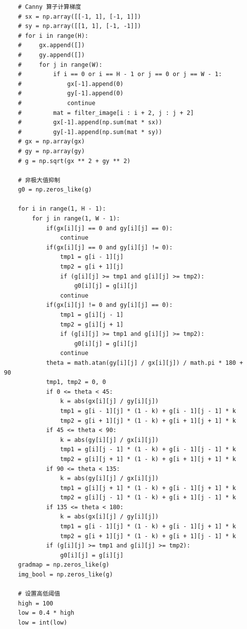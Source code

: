 \documentclass{article}
\begin{document}
\begin{lstlisting}
    # Canny 算子计算梯度
    # sx = np.array([[-1, 1], [-1, 1]])
    # sy = np.array([[1, 1], [-1, -1]])
    # for i in range(H):
    #     gx.append([])
    #     gy.append([])
    #     for j in range(W):
    #         if i == 0 or i == H - 1 or j == 0 or j == W - 1:
    #             gx[-1].append(0)
    #             gy[-1].append(0)
    #             continue
    #         mat = filter_image[i : i + 2, j : j + 2]
    #         gx[-1].append(np.sum(mat * sx))
    #         gy[-1].append(np.sum(mat * sy))
    # gx = np.array(gx)
    # gy = np.array(gy)
    # g = np.sqrt(gx ** 2 + gy ** 2)

    # 非极大值抑制
    g0 = np.zeros_like(g)

    for i in range(1, H - 1):
        for j in range(1, W - 1):
            if(gx[i][j] == 0 and gy[i][j] == 0):
                continue
            if(gx[i][j] == 0 and gy[i][j] != 0):
                tmp1 = g[i - 1][j]
                tmp2 = g[i + 1][j]
                if (g[i][j] >= tmp1 and g[i][j] >= tmp2):
                    g0[i][j] = g[i][j]
                continue
            if(gx[i][j] != 0 and gy[i][j] == 0):
                tmp1 = g[i][j - 1]
                tmp2 = g[i][j + 1]
                if (g[i][j] >= tmp1 and g[i][j] >= tmp2):
                    g0[i][j] = g[i][j]
                continue
            theta = math.atan(gy[i][j] / gx[i][j]) / math.pi * 180 + 90
            tmp1, tmp2 = 0, 0
            if 0 <= theta < 45:
                k = abs(gx[i][j] / gy[i][j])
                tmp1 = g[i - 1][j] * (1 - k) + g[i - 1][j - 1] * k
                tmp2 = g[i + 1][j] * (1 - k) + g[i + 1][j + 1] * k
            if 45 <= theta < 90:
                k = abs(gy[i][j] / gx[i][j])
                tmp1 = g[i][j - 1] * (1 - k) + g[i - 1][j - 1] * k
                tmp2 = g[i][j + 1] * (1 - k) + g[i + 1][j + 1] * k
            if 90 <= theta < 135:
                k = abs(gy[i][j] / gx[i][j])
                tmp1 = g[i][j + 1] * (1 - k) + g[i - 1][j + 1] * k
                tmp2 = g[i][j - 1] * (1 - k) + g[i + 1][j - 1] * k
            if 135 <= theta < 180:
                k = abs(gx[i][j] / gy[i][j])
                tmp1 = g[i - 1][j] * (1 - k) + g[i - 1][j + 1] * k
                tmp2 = g[i + 1][j] * (1 - k) + g[i + 1][j - 1] * k
            if (g[i][j] >= tmp1 and g[i][j] >= tmp2):
                g0[i][j] = g[i][j]
    gradmap = np.zeros_like(g)
    img_bool = np.zeros_like(g)

    # 设置高低阈值
    high = 100
    low = 0.4 * high
    low = int(low)


\end{lstlisting}
\end{document}
